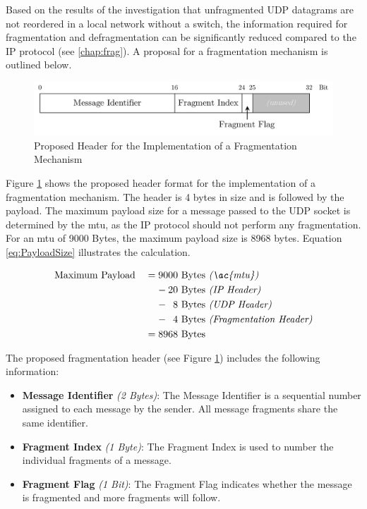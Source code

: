 Based on the results of the investigation that unfragmented UDP datagrams are not reordered in a local network without a switch, the information required for fragmentation and defragmentation can be significantly reduced compared to the IP protocol (see \ref{chap:frag}). A proposal for a fragmentation mechanism is outlined below.

\begin{figure}[h!]
    \centering
    \includegraphics[width=1\linewidth]{figures/outlook/frag_header.pdf}
    \caption{Proposed Header for the Implementation of a Fragmentation Mechanism}
    \label{fig:FragProposal}
\end{figure}

Figure \ref{fig:FragProposal} shows the proposed header format for the implementation of a fragmentation mechanism. The header is 4 bytes in size and is followed by the payload. The maximum payload size for a message passed to the UDP socket is determined by the \ac{mtu}, as the IP protocol should not perform any fragmentation. For an \ac{mtu} of 9000 Bytes, the maximum payload size is 8968 bytes. Equation \ref{eq:PayloadSize} illustrates the calculation.

\begin{alignat}{2}
&\text{Maximum Payload} &&= 9000\ \text{Bytes \textit{(\ac{mtu})}} \label{eq:PayloadSize}\\
&&&\phantom{=}\ - 20\ \text{Bytes \textit{(IP Header)}} \notag \\
&&&\phantom{=}\ - \phantom{0}8\ \text{Bytes \textit{(UDP Header)}} \notag \\
&&&\phantom{=}\ - \phantom{0}4\ \text{Bytes \textit{(Fragmentation Header)}} \notag \\
&&&= 8968\ \text{Bytes} \notag
\end{alignat}

The proposed fragmentation header (see Figure \ref{fig:FragProposal}) includes the following information:

\begin{itemize}
  \item \textbf{Message Identifier} \textit{(2 Bytes)}: The Message Identifier is a sequential number assigned to each message by the sender. All message fragments share the same identifier.
  \item \textbf{Fragment Index} \textit{(1 Byte)}: The Fragment Index is used to number the individual fragments of a message.
  \item \textbf{Fragment Flag} \textit{(1 Bit)}: The Fragment Flag indicates whether the message is fragmented and more fragments will follow.
\end{itemize}

